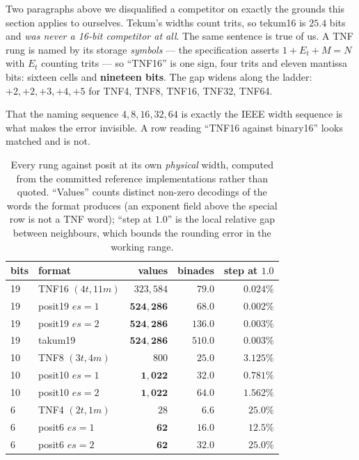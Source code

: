 Two paragraphs above we disqualified a competitor on exactly the grounds this
section applies to ourselves. Tekum's widths count trits, so tekum16 is
$25.4$ bits and \emph{was never a 16-bit competitor at all}. The same sentence
is true of us. A TNF rung is named by its storage \emph{symbols} --- the
specification asserts $1 + E_t + M = N$ with $E_t$ counting trits --- so
``TNF16'' is one sign, four trits and eleven mantissa bits: sixteen cells and
\textbf{nineteen bits}. The gap widens along the ladder: $+2, +2, +3, +4, +5$
for TNF4, TNF8, TNF16, TNF32, TNF64.

That the naming sequence $4, 8, 16, 32, 64$ is exactly the IEEE width sequence
is what makes the error invisible. A row reading ``TNF16 against binary16''
looks matched and is not.

\begin{table}[t]\centering
\caption{Every rung against posit at its own \emph{physical} width, computed
from the committed reference implementations rather than quoted. ``Values'' counts
distinct non-zero decodings of the words the format produces (an exponent field
above the special row is not a TNF word); ``step at $1.0$'' is the local relative
gap between neighbours, which bounds the rounding error in the working range.}
\label{tab:matchedwidth}
\begin{tabular}{llrrr}
\toprule
bits & format & values & binades & step at $1.0$ \\
\midrule
19 & TNF16 $(4t,11m)$ & $323{,}584$          & $79.0$  & $0.024\%$ \\
19 & posit19 $es{=}1$ & $\mathbf{524{,}286}$ & $68.0$  & $\mathbf{0.002\%}$ \\
19 & posit19 $es{=}2$ & $\mathbf{524{,}286}$ & $\mathbf{136.0}$ & $\mathbf{0.003\%}$ \\
19 & takum19          & $\mathbf{524{,}286}$ & $\mathbf{510.0}$ & $\mathbf{0.003\%}$ \\
\midrule
10 & TNF8 $(3t,4m)$   & $800$              & $25.0$ & $3.125\%$ \\
10 & posit10 $es{=}1$ & $\mathbf{1{,}022}$ & $\mathbf{32.0}$ & $\mathbf{0.781\%}$ \\
10 & posit10 $es{=}2$ & $\mathbf{1{,}022}$ & $\mathbf{64.0}$ & $\mathbf{1.562\%}$ \\
\midrule
6  & TNF4 $(2t,1m)$   & $28$          & $6.6$  & $25.0\%$ \\
6  & posit6 $es{=}1$  & $\mathbf{62}$ & $\mathbf{16.0}$ & $\mathbf{12.5\%}$ \\
6  & posit6 $es{=}2$  & $\mathbf{62}$ & $\mathbf{32.0}$ & $25.0\%$ \\
\bottomrule
\end{tabular}
\end{table}

